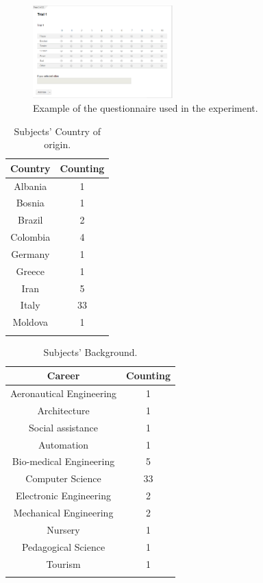 \begin{figure}
	\centering
	\includegraphics[width=0.48\textwidth]{./Images/example_survey.png} 
	\caption{Example of the questionnaire used in the experiment.}
	\label{fig:questionnaire_example}
\end{figure}

\begin{table}[h]
\centering
\caption{Subjects' Country of origin.}
\label{table:country}
\begin{tabular}{|c|c|}
\hline
\textbf{Country} & \textbf{Counting} \\
\hline
Albania & 1 \\
\hline
Bosnia & 1 \\
\hline
Brazil & 2 \\
\hline
Colombia & 4 \\
\hline
Germany & 1 \\
\hline
Greece & 1 \\
\hline
Iran & 5 \\
\hline
Italy & 33 \\
\hline
Moldova & 1 \\
\hline 
\multicolumn{2}{c}{}
\end{tabular} 
\end{table}

\begin{table}[h]
\centering
\caption{Subjects' Background.}
\label{table:career}
\begin{tabular}{|c|c|}
\hline
\textbf{Career} & \textbf{Counting}\\
\hline
Aeronautical Engineering & 1 \\
\hline
Architecture & 1 \\
\hline
Social assistance & 1 \\
\hline
Automation & 1 \\
\hline
Bio-medical Engineering & 5 \\
\hline
Computer Science & 33 \\
\hline
Electronic Engineering & 2 \\
\hline
Mechanical Engineering & 2 \\
\hline
Nursery & 1 \\
\hline
Pedagogical Science & 1 \\
\hline
Tourism & 1 \\
\hline
\multicolumn{2}{c}{}
\end{tabular} 
\end{table}